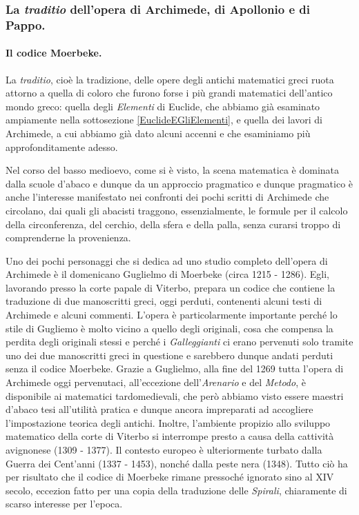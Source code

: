 \subsubsection{La \textit{traditio} dell'opera di Archimede, di Apollonio e di Pappo.}\label{LaTraditioDellOperaDiArchimedeDiApollonioEDiPappo}
\paragraph{Il codice Moerbeke.} La \textit{traditio}, cio\`e la tradizione, delle opere degli antichi matematici greci ruota attorno a quella di coloro che furono forse i pi\`u grandi matematici dell'antico mondo greco: quella degli \textit{Elementi} di Euclide, che abbiamo gi\`a esaminato ampiamente nella sottosezione \ref{EuclideEGliElementi}, e quella dei lavori di Archimede, a cui abbiamo gi\`a dato alcuni accenni e che esaminiamo pi\`u approfonditamente adesso.
\par Nel corso del basso medioevo, come si \`e visto, la scena matematica \`e dominata dalla scuole d'abaco e dunque da un approccio pragmatico e dunque pragmatico \`e anche l'interesse manifestato nei confronti dei pochi scritti di Archimede che circolano, dai quali gli abacisti traggono, essenzialmente, le formule per il calcolo della circonferenza, del cerchio, della sfera e della palla, senza curarsi troppo di comprenderne la provenienza.
\par Uno dei pochi personaggi che si dedica ad uno studio completo dell'opera di Archimede \`e il domenicano Guglielmo di Moerbeke (circa 1215 - 1286). Egli, lavorando presso la corte papale di Viterbo, prepara un codice che contiene la traduzione di due manoscritti greci, oggi perduti, contenenti alcuni testi di Archimede e alcuni commenti. L'opera \`e particolarmente importante perch\'e lo stile di Gugliemo \`e molto vicino a quello degli originali, cosa che compensa la perdita degli originali stessi e perch\'e i \textit{Galleggianti} ci erano pervenuti solo tramite uno dei due manoscritti greci in questione e sarebbero dunque andati perduti senza il codice Moerbeke. Grazie a Guglielmo, alla fine del 1269 tutta l'opera di Archimede oggi pervenutaci, all'eccezione dell'\textit{Arenario} e del \textit{Metodo}, \`e disponibile ai matematici tardomedievali, che per\`o abbiamo visto essere maestri d'abaco tesi all'utilit\`a pratica e dunque ancora impreparati ad accogliere l'impostazione teorica degli antichi. Inoltre, l'ambiente propizio allo sviluppo matematico della corte di Viterbo si interrompe presto a causa della cattivit\`a avignonese (1309 - 1377). Il contesto europeo \`e ulteriormente turbato dalla Guerra dei Cent'anni (1337 - 1453), nonch\'e dalla peste nera (1348). Tutto ci\`o ha per risultato che il codice di Moerbeke rimane pressoch\'e ignorato sino al XIV secolo, eccezion fatto per una copia della traduzione delle \textit{Spirali}, chiaramente di scarso interesse per l'epoca.
